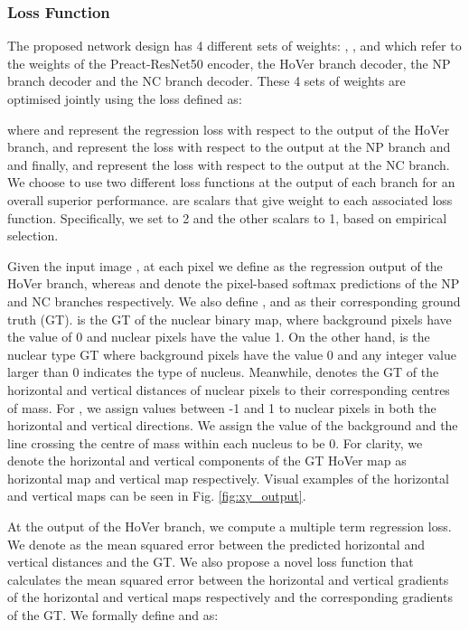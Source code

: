 \documentclass[journal]{IEEEtran}
\begin{document}
	\subsubsection{Loss Function} \label{section:loss}
	
	The proposed network design has 4 different sets of weights: , ,   and  which refer to the weights of the Preact-ResNet50 encoder, the HoVer branch decoder, the NP branch decoder and the NC branch decoder. These 4 sets of weights are optimised jointly using the loss  defined as:

	\noindent where  and  represent the regression loss with respect to the output of the HoVer branch,  and  represent the loss with respect to the output at the NP branch and and finally,  and  represent the loss with respect to the output at the NC branch. We choose to use two different loss functions at the output of each branch for an overall superior performance.  are scalars that give weight to each associated loss function. Specifically, we set  to 2 and the other scalars to 1, based on empirical selection.
	
	
	Given the input image , at each pixel  we define  as the regression output of the HoVer branch, whereas  and  denote the pixel-based softmax predictions of the NP and NC branches respectively. We also define ,  and  as their corresponding ground truth (GT).  is the GT of the nuclear binary map, where background pixels have the value of 0 and nuclear pixels have the value 1. On the other hand,  is the nuclear type GT where background pixels have the value 0 and any integer value larger than 0 indicates the type of nucleus. Meanwhile,  denotes the GT of the horizontal and vertical distances of nuclear pixels to their corresponding centres of mass. For , we assign values between -1 and 1 to nuclear pixels in both the horizontal and vertical directions. We assign the value of the background and the line crossing the centre of mass within each nucleus to be 0. For clarity, we denote the horizontal and vertical components of the GT HoVer map as horizontal map  and vertical map  respectively. Visual examples of the horizontal and vertical maps can be seen in Fig. \ref{fig:xy_output}.
	
	At the output of the HoVer branch, we compute a multiple term regression loss. We denote  as the mean squared error between the predicted horizontal and vertical distances and the GT. We also propose a novel loss function  that calculates the mean squared error between the horizontal and vertical gradients of the horizontal and vertical maps respectively and the corresponding gradients of the GT. We formally define  and  as:
	
\end{document}
